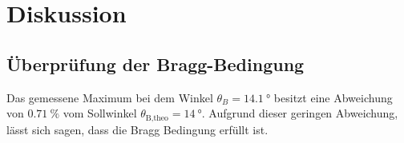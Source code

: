 \section{Diskussion}
\label{sec:Diskussion}
\subsection{Überprüfung der Bragg-Bedingung}

Das gemessene Maximum bei dem Winkel $\theta_B = \qty{14.1}{°}$ besitzt eine Abweichung von 
$\qty{0.71}{\%}$ vom Sollwinkel $\theta_\text{B,theo} = \qty{14}{°}$.
Aufgrund dieser geringen Abweichung, lässt sich sagen, dass die Bragg Bedingung erfüllt ist.